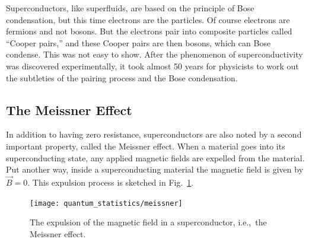 Superconductors, like superfluids, are based on the principle of Bose
condensation, but this time electrons are the particles.  Of course
electrons are fermions and not bosons.  But the electrons pair into
composite particles called ``Cooper pairs,'' and these Cooper pairs
are then bosons, which can Bose condense.  This was not easy to show.
After the phenomenon of superconductivity was discovered
experimentally, it took almost 50 years for physicists to work out the
subtleties of the pairing process and the Bose condensation.



%
\subsection{The Meissner Effect}

In addition to having zero resistance, superconductors are also noted
by a second important property, called the Meissner effect.  When a
material goes into its superconducting state, any applied magnetic
fields are expelled from the material.  Put another way, inside a
superconducting material the magnetic field is given by $\vec B=0$.
This expulsion process is sketched in Fig.~\ref{fig:meissner}.

\begin{figure}[tbp]
\begin{center}
\texttt{[image: quantum\_statistics/meissner]}
\caption{The expulsion of the magnetic field in a superconductor, i.e.,\
the Meissner effect.}
\label{fig:meissner}
\end{center}
\end{figure}

